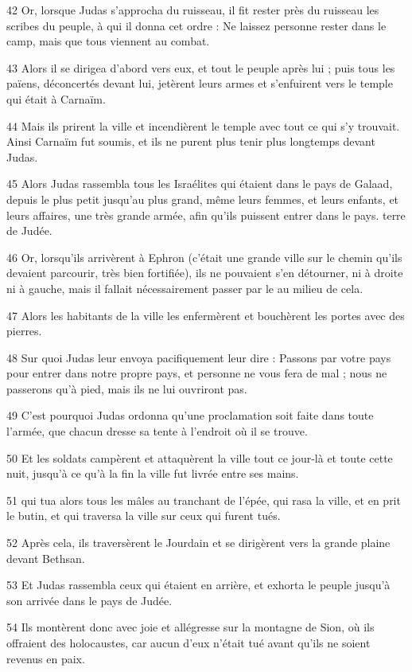 \par 42 Or, lorsque Judas s'approcha du ruisseau, il fit rester près du ruisseau les scribes du peuple, à qui il donna cet ordre : Ne laissez personne rester dans le camp, mais que tous viennent au combat.
\par 43 Alors il se dirigea d'abord vers eux, et tout le peuple après lui ; puis tous les païens, déconcertés devant lui, jetèrent leurs armes et s'enfuirent vers le temple qui était à Carnaïm.
\par 44 Mais ils prirent la ville et incendièrent le temple avec tout ce qui s'y trouvait. Ainsi Carnaïm fut soumis, et ils ne purent plus tenir plus longtemps devant Judas.
\par 45 Alors Judas rassembla tous les Israélites qui étaient dans le pays de Galaad, depuis le plus petit jusqu'au plus grand, même leurs femmes, et leurs enfants, et leurs affaires, une très grande armée, afin qu'ils puissent entrer dans le pays. terre de Judée.
\par 46 Or, lorsqu'ils arrivèrent à Ephron (c'était une grande ville sur le chemin qu'ils devaient parcourir, très bien fortifiée), ils ne pouvaient s'en détourner, ni à droite ni à gauche, mais il fallait nécessairement passer par le au milieu de cela.
\par 47 Alors les habitants de la ville les enfermèrent et bouchèrent les portes avec des pierres.
\par 48 Sur quoi Judas leur envoya pacifiquement leur dire : Passons par votre pays pour entrer dans notre propre pays, et personne ne vous fera de mal ; nous ne passerons qu'à pied, mais ils ne lui ouvriront pas.
\par 49 C'est pourquoi Judas ordonna qu'une proclamation soit faite dans toute l'armée, que chacun dresse sa tente à l'endroit où il se trouve.
\par 50 Et les soldats campèrent et attaquèrent la ville tout ce jour-là et toute cette nuit, jusqu'à ce qu'à la fin la ville fut livrée entre ses mains.
\par 51 qui tua alors tous les mâles au tranchant de l'épée, qui rasa la ville, et en prit le butin, et qui traversa la ville sur ceux qui furent tués.
\par 52 Après cela, ils traversèrent le Jourdain et se dirigèrent vers la grande plaine devant Bethsan.
\par 53 Et Judas rassembla ceux qui étaient en arrière, et exhorta le peuple jusqu'à son arrivée dans le pays de Judée.
\par 54 Ils montèrent donc avec joie et allégresse sur la montagne de Sion, où ils offraient des holocaustes, car aucun d'eux n'était tué avant qu'ils ne soient revenus en paix.
